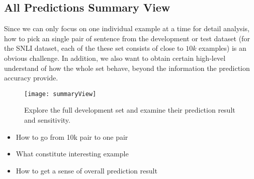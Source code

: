 \subsection{All Predictions Summary View}
\label{sec:allPairs}
Since we can only focus on one individual example at a time for detail analysis,
how to pick an single pair of sentence from the development or test dataset (for the SNLI dataset, each of the these set consists of close to $10k$ examples) is an obvious challenge.
%
In addition, we also want to obtain certain high-level understand of how the whole set behave, beyond the information the prediction accuracy provide.

\begin{figure}[htbp]
\centering
\vspace{-2mm}
 \texttt{[image: summaryView]}
 \caption{Explore the full development set and examine their prediction result and sensitivity.}
\label{fig:modelPipeline}
\end{figure}

\begin{itemize}
\item How to go from 10k pair to one pair
\item What constitute interesting example
\item How to get a sense of overall prediction result
\end{itemize}
